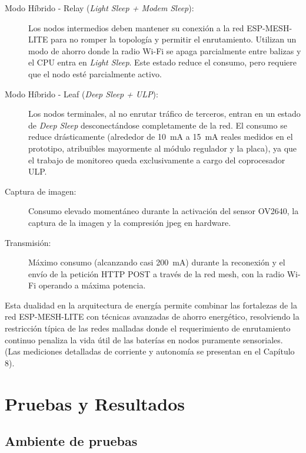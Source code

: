 \documentclass[a4paper, 12pt]{report}
\begin{document}
\begin{description}
  \item[Modo Híbrido - Relay (\textit{Light Sleep + Modem Sleep}):] Los nodos intermedios deben mantener su conexión a la red \gls{ESP-MESH-LITE} para no romper la topología y permitir el enrutamiento. Utilizan un modo de ahorro donde la radio Wi-Fi se apaga parcialmente entre balizas y el CPU entra en \textit{Light Sleep}. Este estado reduce el consumo, pero requiere que el nodo esté parcialmente activo.
  \item[Modo Híbrido - Leaf (\textit{Deep Sleep + ULP}):] Los nodos terminales, al no enrutar tráfico de terceros, entran en un estado de \textit{Deep Sleep} desconectándose completamente de la red. El consumo se reduce drásticamente (alrededor de \qty{10}{mA} a \qty{15}{mA} reales medidos en el prototipo, atribuibles mayormente al módulo regulador y la placa), ya que el trabajo de monitoreo queda exclusivamente a cargo del coprocesador ULP.
  \item[Captura de imagen:] Consumo elevado momentáneo durante la activación
    del sensor OV2640, la captura de la imagen y la compresión \gls{jpeg}
    en hardware.
  \item[Transmisión:] Máximo consumo (alcanzando casi \qty{200}{mA}) durante la reconexión y el envío de la petición HTTP POST a través de la red mesh, con la radio Wi-Fi operando a máxima potencia.
\end{description}

Esta dualidad en la arquitectura de energía permite combinar las fortalezas de la red \gls{ESP-MESH-LITE} con técnicas avanzadas de ahorro energético, resolviendo la restricción típica de las redes malladas donde el requerimiento de enrutamiento continuo penaliza la vida útil de las baterías en nodos puramente sensoriales. (Las mediciones detalladas de corriente y autonomía se presentan en el Capítulo 8).

\chapter{Pruebas y Resultados}

\section{Ambiente de pruebas}
\end{document}
